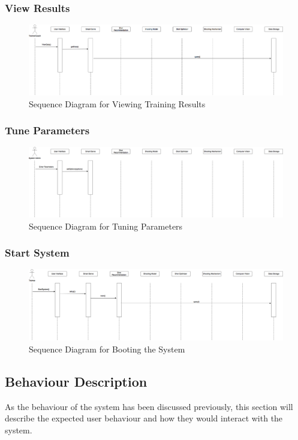 \documentclass[11pt]{article}
\begin{document}
\subsubsection*{View Results}
\begin{figure}[htbp]
   \centering
   \includegraphics[width=\textwidth]{img/SequenceDiagram-View.png}
   \caption{Sequence Diagram for Viewing Training Results}
   \label{fig:view}
\end{figure}
\subsubsection*{Tune Parameters}
\begin{figure}[htbp]
   \centering
   \includegraphics[width=\textwidth]{img/SequenceDiagram-Tune.png}
   \caption{Sequence Diagram for Tuning Parameters}
   \label{fig:tune}
\end{figure}
\subsubsection*{Start System}
\begin{figure}[H]
   \centering
   \includegraphics[width=\textwidth]{img/SequenceDiagram-Boot.png}
   \caption{Sequence Diagram for Booting the System}
   \label{fig:boot}
\end{figure}
\subsection{Behaviour Description}
As the behaviour of the system has been discussed previously, this section will describe the expected user behaviour and how they would interact with the system.
\end{document}
